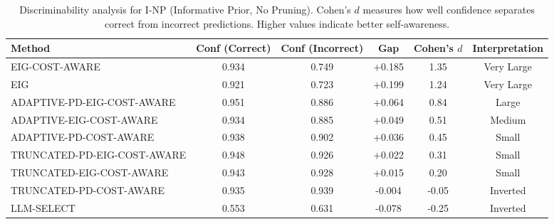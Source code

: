 \begin{table}[htbp]
\centering
\small
\caption{Discriminability analysis for I-NP (Informative Prior, No Pruning). Cohen's $d$ measures how well confidence separates correct from incorrect predictions. Higher values indicate better self-awareness.}
\label{tab:discriminability-notprune_notuniform}
\begin{tabular}{@{}lccccc@{}}
\toprule
Method & Conf (Correct) & Conf (Incorrect) & Gap & Cohen's $d$ & Interpretation \\
\midrule
EIG-COST-AWARE & 0.934 & 0.749 & +0.185 & 1.35 & Very Large \\
EIG & 0.921 & 0.723 & +0.199 & 1.24 & Very Large \\
ADAPTIVE-PD-EIG-COST-AWARE & 0.951 & 0.886 & +0.064 & 0.84 & Large \\
ADAPTIVE-EIG-COST-AWARE & 0.934 & 0.885 & +0.049 & 0.51 & Medium \\
ADAPTIVE-PD-COST-AWARE & 0.938 & 0.902 & +0.036 & 0.45 & Small \\
TRUNCATED-PD-EIG-COST-AWARE & 0.948 & 0.926 & +0.022 & 0.31 & Small \\
TRUNCATED-EIG-COST-AWARE & 0.943 & 0.928 & +0.015 & 0.20 & Small \\
TRUNCATED-PD-COST-AWARE & 0.935 & 0.939 & -0.004 & -0.05 & Inverted \\
LLM-SELECT & 0.553 & 0.631 & -0.078 & -0.25 & Inverted \\
\bottomrule
\end{tabular}
\end{table}